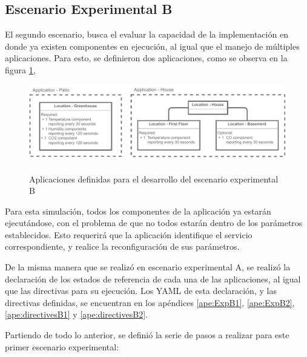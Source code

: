 \subsection{Escenario Experimental B} \label{sec:EscenarioExperimentalB}

El segundo escenario, busca el evaluar la capacidad de la implementación en donde ya existen componentes en ejecución, al igual que el manejo de múltiples aplicaciones. Para esto, se definieron dos aplicaciones, como se observa en la figura \ref{fig:ExpB}, 

\begin{figure}[H]
    \centering
    \caption{\\Aplicaciones definidas para el desarrollo del escenario experimental B}
    \label{fig:ExpB}
    \includegraphics[width=\linewidth]{images/ScenarioB.pdf}
    \vspace{-4mm}
\end{figure}

Para esta simulación, todos los componentes de la aplicación ya estarán ejecutándose, con el problema de que no todos estarán dentro de los parámetros establecidos. Esto requerirá que la aplicación identifique el servicio correspondiente, y realice la reconfiguración de sus parámetros.

De la misma manera que se realizó en escenario experimental A, se realizó la declaración de los estados de referencia de cada una de las aplicaciones, al igual que las directivas para su ejecución. Los YAML de esta declaración, y las directivas definidas, se encuentran en los apéndices \ref{ape:ExpB1}, \ref{ape:ExpB2}, \ref{ape:directivesB1} y \ref{ape:directivesB2}.

Partiendo de todo lo anterior, se definió la serie de pasos a realizar para este primer escenario experimental:

